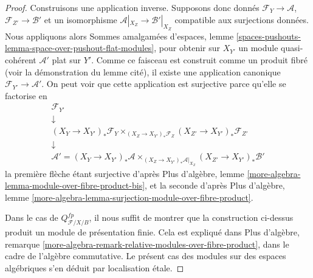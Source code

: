 \begin{proof}
Construisons une application inverse. Supposons donc donnés
$\mathcal{F}_Y \to \mathcal{A}$,
$\mathcal{F}_{Z'} \to \mathcal{B}'$ et un isomorphisme
$\mathcal{A}|_{X_Z} \to \mathcal{B}'|_{X_Z}$ compatible aux surjections
données. Nous appliquons alors Sommes amalgamées d'espaces, lemme
\ref{spaces-pushouts-lemma-space-over-pushout-flat-modules}, pour obtenir sur
$X_{Y'}$ un module quasi-cohérent $\mathcal{A}'$ plat sur $Y'$. Comme ce
faisceau est construit comme un produit fibré (voir la démonstration du lemme
cité), il existe une application canonique
$\mathcal{F}_{Y'} \to \mathcal{A}'$. On peut voir que cette application est
surjective parce qu'elle se factorise en
$$
\begin{matrix}
\mathcal{F}_{Y'} \\
\downarrow \\
(X_Y \to X_{Y'})_*\mathcal{F}_Y
\times_{(X_Z \to X_{Y'})_*\mathcal{F}_Z}
(X_{Z'} \to X_{Y'})_*\mathcal{F}_{Z'} \\
\downarrow \\
\mathcal{A}' =
(X_Y \to X_{Y'})_*\mathcal{A}
\times_{(X_Z \to X_{Y'})_*\mathcal{A}|_{X_Z}}
(X_{Z'} \to X_{Y'})_*\mathcal{B}'
\end{matrix}
$$
la première flèche étant surjective d'après Plus d'algèbre, lemme
\ref{more-algebra-lemma-module-over-fibre-product-bis}, et la seconde d'après
Plus d'algèbre, lemme
\ref{more-algebra-lemma-surjection-module-over-fibre-product}.

\medskip\noindent
Dans le cas de $Q^{fp}_{\mathcal{F}/X/B}$, il nous suffit de montrer que la
construction ci-dessus produit un module de présentation finie. Cela est
expliqué dans Plus d'algèbre, remarque
\ref{more-algebra-remark-relative-modules-over-fibre-product}, dans le cadre de
l'algèbre commutative. Le présent cas des modules sur des espaces algébriques
s'en déduit par localisation étale.
\end{proof}

